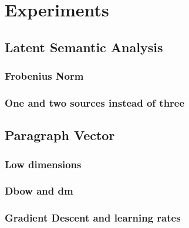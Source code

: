 \chapter{Experiments}
\section{Latent Semantic Analysis}
\subsection{Frobenius Norm}
\subsection{One and two sources instead of three}

\section{Paragraph Vector}
\subsection{Low dimensions}
\subsection{Dbow and dm}
\subsection{Gradient Descent and learning rates}

